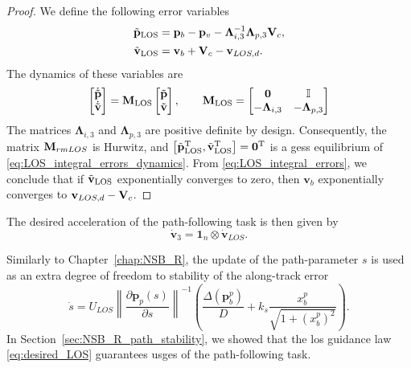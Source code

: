 \begin{proof}
 We define the following error variables 
\begin{subequations}\label{eq:LOS_integral_errors}
 \begin{align}
     \Tilde{\mathbf{p}}_{\rm LOS} &= \mathbf{p}_b-\mathbf{p}_v - \bm{\Lambda}_{i,3}^{-1}\bm{\Lambda}_{p,3} \mathbf{V}_c,\\
     \Tilde{\mathbf{v}}_{\rm LOS} &= \mathbf{v}_b + \mathbf{V}_c - \mathbf{v}_{LOS,d}.
 \end{align}
\end{subequations}
The dynamics of these variables are
\begin{equation}
    \begin{bmatrix}
        \dot{\Tilde{\mathbf{p}}} \\ \dot{\Tilde{\mathbf{v}}}
    \end{bmatrix} 
    = 
    \mathbf{M}_{\rm LOS}
    \begin{bmatrix}
        \Tilde{\mathbf{p}} \\ \Tilde{\mathbf{v}}
    \end{bmatrix}, 
    \qquad
    \mathbf{M}_{\rm LOS}
    =
    \begin{bmatrix}
        \mathbf{0} & \mathbb{I}\\
        -\mathbf{\Lambda}_{i,3} & -\mathbf{\Lambda}_{p,3}
    \end{bmatrix}
    \label{eq:LOS_integral_errors_dynamics}
\end{equation}
The matrices $\mathbf{\Lambda}_{i,3}$ and $\mathbf{\Lambda}_{p,3}$ are positive definite by design.
Consequently, the matrix $\mathbf{M}_{rm LOS}$ is Hurwitz, and $\left[\Tilde{\mathbf{p}}_{\rm LOS}^{\mathrm{T}}, \Tilde{\mathbf{v}}_{\rm LOS}^{\mathrm{T}}\right] = \mathbf{0}^{\mathrm{T}}$ is a \glspl{ges} equilibrium of \eqref{eq:LOS_integral_errors_dynamics}.
From \eqref{eq:LOS_integral_errors}, we conclude that if $\Tilde{\mathbf{v}}_{\rm LOS}$ exponentially converges to zero, then $\mathbf{v}_b$ exponentially converges to $\mathbf{v}_{LOS,d}-\mathbf{V}_c$.
\end{proof}

The desired acceleration of the path-following task is then given by
\begin{equation}
    \dot{\mathbf{v}}_3 = \mathbf{1}_{n} \otimes \dot{\mathbf{v}}_{LOS}.
\end{equation}

Similarly to Chapter~\ref{chap:NSB_R}, the update of the path-parameter $s$ is used as an extra degree of freedom to stability of the along-track error
\begin{equation}\label{eq:path_update}
    \dot{s} = U_{LOS}\left \| \frac{\partial \mathbf{p}_p(s)}{\partial s}\right \|^{-1} \left (\frac{\Delta(\mathbf{p}_b^p)}{D} +  k_s\frac{x_b^p}{\sqrt{1 + (x_b^p)^2}} \right ).
\end{equation}
In Section~\ref{sec:NSB_R_path_stability}, we showed that the \gls{los} guidance law \eqref{eq:desired_LOS} guarantees \acrfull{usges} of the path-following task.

